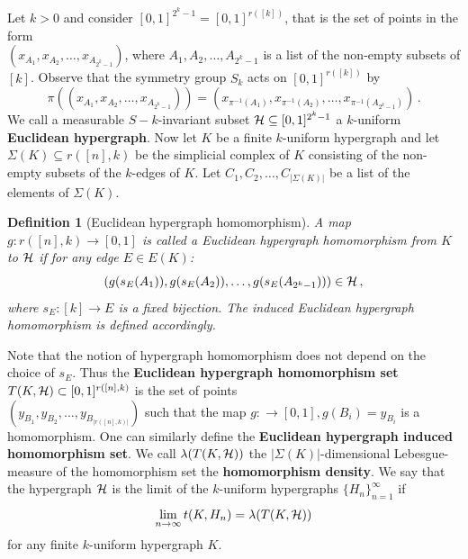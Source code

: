 \documentclass [11pt] {article}
\newtheorem{definition}{Definition}[section]
\def\limn{\lim_{n\to\infty}}
\def\cH{\mbox{$\cal H$}}
\def\to{\rightarrow}
\begin{document}
\noindent
Let $k>0$ and consider $[0,1]^{2^k-1}=[0,1]^{r([k])}$,
that is the set of points in the form \\
$(x_{A_1},x_{A_2},\dots,x_{A_{2^k-1}})$,
where $A_1,A_2,\dots,A_{2^k-1}$ is a list of the non-empty subsets of $[k]$.
Observe that the symmetry group $S_k$ acts on $[0,1]^{r([k])}$ by
$$\pi((x_{A_1},x_{A_2},\dots,x_{A_{2^k-1}}))=
(x_{\pi^{-1}(A_1)},x_{\pi^{-1}(A_2)},\dots,x_{\pi^{-1}(A_{2^k-1})})\,.$$
We call a measurable $S-k$-invariant subset $\cH\subseteq [0,1]^{2^k-1}$
a $k$-uniform {\bf Euclidean hypergraph}. Now let $K$ be a finite $k$-uniform
hypergraph and let $\Sigma(K)\subseteq
r([n],k)$ be the simplicial complex of $K$ consisting
of the non-empty subsets of the $k$-edges of $K$.
Let $C_1,C_2,\dots,C_{|\Sigma(K)|}$ be a list of the elements of $\Sigma(K)$.
\begin{definition}[Euclidean hypergraph homomorphism]
A map $g: r([n],k)\to [0,1]$ is called a Euclidean
hypergraph homomorphism
from $K$ to $\cH$
if for any edge $E\in E(K)$:
$$(g(s_E(A_1)), g(s_E(A_2)),\dots, g(s_E(A_{2^k-1})))\in\cH\,,$$
where $s_E:[k]\to E$ is a fixed bijection. The induced Euclidean hypergraph
homomorphism is defined accordingly.
\end{definition}
 Note that the notion of
 hypergraph homomorphism does not depend on the choice of $s_E$.
Thus the {\bf Euclidean hypergraph homomorphism set}
$T(K,\cH)\subset [0,1]^{r([n],k)}$
is the set of points \\$(y_{B_1},y_{B_2},\dots, y_{B_{|r([n],k)|}})$ such that
the map $g:\to [0,1], g(B_i)=y_{B_i}$ is a homomorphism.
One can similarly define the 
{\bf Euclidean hypergraph induced homomorphism set}.
We call $\lambda(T(K,\cH))$ the $|\Sigma(K)|$-dimensional Lebesgue-measure
of the homomorphism set the {\bf homomorphism density}. We say that
the hypergraph $\cH$ is the limit of the $k$-uniform hypergraphs
$\{H_n\}^\infty_{n=1}$ if
$$\limn t(K,H_n)=\lambda(T(K,\cH))$$
for any finite $k$-uniform hypergraph $K$.
\end{document}
